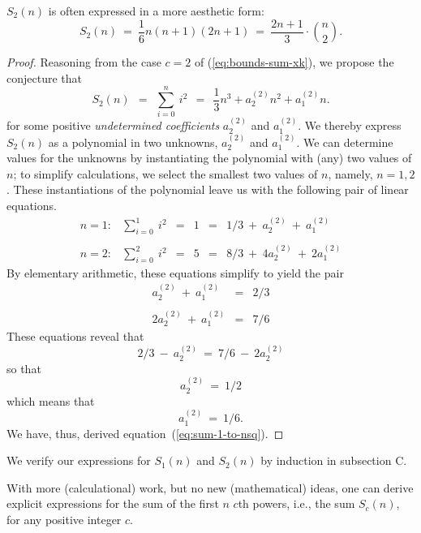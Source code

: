 \noindent
$S_2(n)$ is often expressed in a more aesthetic form:
\[ S_2(n) \ = \
\frac{1}{6} n (n+1)(2n+1) \ = \
\frac{2n+1}{3} \cdot {n \choose 2}.
\]

\begin{proof}
Reasoning from the case $c=2$ of (\ref{eq:bounds-sum-xk}), we
propose the conjecture that
\begin{equation}
\label{eq:symbolic-cubic}
S_2(n) \ \ = \ \
\sum_{i=0}^n \ i^2 \ \ = \ \ \frac{1}{3} n^3 + a^{(2)}_2 n^2 + a^{(2)}_1 n.
\end{equation}
for some positive {\it undetermined coefficients} $a^{(2)}_2$ and
$a^{(2)}_1$.  We thereby express $S_2(n)$ as a polynomial in two
unknowns, $a^{(2)}_2$ and $a^{(2)}_1$.  We can determine values for
the unknowns by instantiating the polynomial with (any) two values of
$n$; to simplify calculations, we select the smallest two values of
$n$, namely, $n = 1,2$.  These instantiations of the polynomial leave
us with the following pair of linear equations.
\[
\begin{array}{cccccl}
n=1: & \sum_{i=0}^1 \ i^2
   & = & 1 & = &
1/3 \ + \ a^{(2)}_2 \ + \ a^{(2)}_1 \\
 & & & & & \\
n=2: & \sum_{i=0}^2 \ i^2
   & = & 5 & = &
8/3 \ + \ 4 a^{(2)}_2 \ + \ 2 a^{(2)}_1
\end{array}
\]
By elementary arithmetic, these equations simplify to yield the pair
\[
\begin{array}{ccc}
a^{(2)}_2 \ + \ a^{(2)}_1   & = & 2/3 \\
 & & \\
2 a^{(2)}_2 \ + \ a^{(2)}_1 & = & 7/6
\end{array}
\]
These equations reveal that
\[ 2/3 \ - \ a^{(2)}_2 \ = \ 7/6 \ - \ 2 a^{(2)}_2 \]
so that 
\[ a^{(2)}_2 \ = \ 1/2 \]
which means that
\[ a^{(2)}_1 \ = \ 1/6. \]
We have, thus, derived equation~(\ref{eq:sum-1-to-nsq}).  
\end{proof}

\medskip

We verify our expressions for $S_1(n)$ and $S_2(n)$ by induction in
subsection C.

\medskip

With more (calculational) work, but no new (mathematical) ideas, one
can derive explicit expressions for the sum of the first $n$ $c$th
powers, i.e., the sum $S_c(n)$, for any positive integer $c$.

